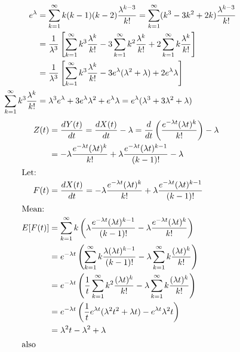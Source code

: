 \begin{enumerate}
    \begin{align*}
      e^{\lambda} & = \sum_{k=1}^{\infty} k(k-1)(k-2) \dfrac{\lambda^{k-3}}{k!}
                    = \sum_{k=1}^{\infty} (k^3 - 3k^2 + 2k) \dfrac{\lambda^{k-3}}{k!} \\
                  & = \dfrac{1}{\lambda^3} \left[ \sum_{k=1}^{\infty} k^3 \dfrac{\lambda^k}{k!}
                    - 3 \sum_{k=1}^{\infty} k^2 \dfrac{\lambda^k}{k!}
                    + 2 \sum_{k=1}^{\infty} k \dfrac{\lambda^k}{k!} \right] \\
                  & = \dfrac{1}{\lambda^3} \left[ \sum_{k=1}^{\infty} k^3 \dfrac{\lambda^k}{k!}
                    -3e^{\lambda} (\lambda^2 + \lambda) + 2e^{\lambda}\lambda \right] \\
      \sum_{k=1}^{\infty} k^3 \dfrac{\lambda^k}{k!}
                  & = \lambda^3e^{\lambda} + 3e^{\lambda}\lambda^2 + e^{\lambda}\lambda
                    = e^{\lambda}(\lambda^3 + 3\lambda^2 + \lambda)
    \end{align*}
    \begin{align*}
      Z(t) & = \df{dY(t)}{dt} = \df{dX(t)}{dt} - \lambda
             = \df{d}{dt} \left(\df{e^{-\lambda t} (\lambda t)^k}{k!}\right) - \lambda \\
           & = -\lambda \df{e^{-\lambda t} (\lambda t)^k}{k!} +
             \lambda \df{e^{-\lambda t} (\lambda t)^{k-1}}{(k-1)!} - \lambda \\
      \shortintertext{Let:}
      F(t) & = \df{dX(t)}{dt}
             = -\lambda \df{e^{-\lambda t} (\lambda t)^k}{k!} + \lambda \df{e^{-\lambda t} (\lambda t)^{k-1}}{(k-1)!} \\
      \shortintertext{Mean:}
      E[F(t)] & = \sum_{k=1}^{\infty} k \left( \lambda \df{e^{-\lambda t} (\lambda t)^{k-1}}{(k-1)!}
                -\lambda \df{e^{-\lambda t} (\lambda t)^k}{k!} \right) \\
           & = e^{-\lambda t} \left( \sum_{k=1}^{\infty} k \df{\lambda (\lambda t)^{k-1}}{(k-1)!}
             - \lambda \sum_{k=1}^{\infty} k \df{(\lambda t)^k}{k!}\right) \\
           & = e^{-\lambda t} \left( \df{1}{t}\sum_{k=1}^{\infty} k^2 \df{(\lambda t)^{k}}{k!}
             - \lambda \sum_{k=1}^{\infty} k \df{(\lambda t)^k}{k!}\right) \\
           & = e^{-\lambda t} \left(  \df{1}{t} e^{\lambda t}(\lambda^2 t^2 + \lambda t) - e^{\lambda t}\lambda^2 t\right) \\
           & = \lambda^2 t - \lambda^2 + \lambda \\
      \shortintertext{also}

\end{align*}
\end{enumerate}
